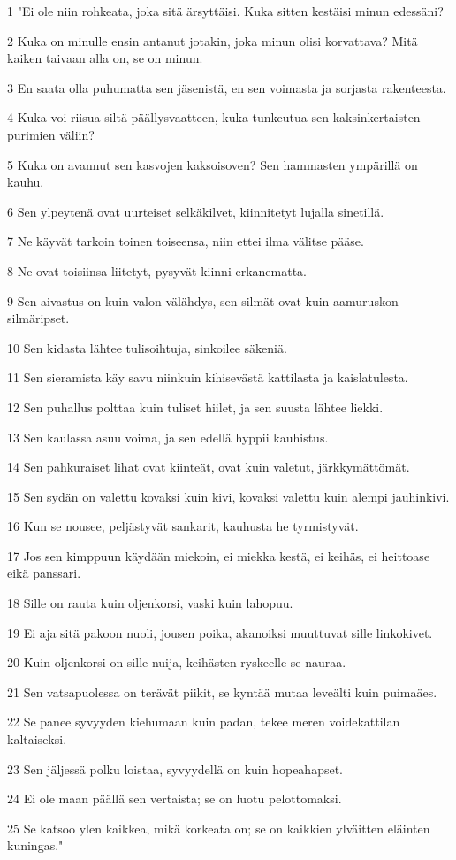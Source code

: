 \par 1 "Ei ole niin rohkeata, joka sitä ärsyttäisi. Kuka sitten kestäisi minun edessäni?
\par 2 Kuka on minulle ensin antanut jotakin, joka minun olisi korvattava? Mitä kaiken taivaan alla on, se on minun.
\par 3 En saata olla puhumatta sen jäsenistä, en sen voimasta ja sorjasta rakenteesta.
\par 4 Kuka voi riisua siltä päällysvaatteen, kuka tunkeutua sen kaksinkertaisten purimien väliin?
\par 5 Kuka on avannut sen kasvojen kaksoisoven? Sen hammasten ympärillä on kauhu.
\par 6 Sen ylpeytenä ovat uurteiset selkäkilvet, kiinnitetyt lujalla sinetillä.
\par 7 Ne käyvät tarkoin toinen toiseensa, niin ettei ilma välitse pääse.
\par 8 Ne ovat toisiinsa liitetyt, pysyvät kiinni erkanematta.
\par 9 Sen aivastus on kuin valon välähdys, sen silmät ovat kuin aamuruskon silmäripset.
\par 10 Sen kidasta lähtee tulisoihtuja, sinkoilee säkeniä.
\par 11 Sen sieramista käy savu niinkuin kihisevästä kattilasta ja kaislatulesta.
\par 12 Sen puhallus polttaa kuin tuliset hiilet, ja sen suusta lähtee liekki.
\par 13 Sen kaulassa asuu voima, ja sen edellä hyppii kauhistus.
\par 14 Sen pahkuraiset lihat ovat kiinteät, ovat kuin valetut, järkkymättömät.
\par 15 Sen sydän on valettu kovaksi kuin kivi, kovaksi valettu kuin alempi jauhinkivi.
\par 16 Kun se nousee, peljästyvät sankarit, kauhusta he tyrmistyvät.
\par 17 Jos sen kimppuun käydään miekoin, ei miekka kestä, ei keihäs, ei heittoase eikä panssari.
\par 18 Sille on rauta kuin oljenkorsi, vaski kuin lahopuu.
\par 19 Ei aja sitä pakoon nuoli, jousen poika, akanoiksi muuttuvat sille linkokivet.
\par 20 Kuin oljenkorsi on sille nuija, keihästen ryskeelle se nauraa.
\par 21 Sen vatsapuolessa on terävät piikit, se kyntää mutaa leveälti kuin puimaäes.
\par 22 Se panee syvyyden kiehumaan kuin padan, tekee meren voidekattilan kaltaiseksi.
\par 23 Sen jäljessä polku loistaa, syvyydellä on kuin hopeahapset.
\par 24 Ei ole maan päällä sen vertaista; se on luotu pelottomaksi.
\par 25 Se katsoo ylen kaikkea, mikä korkeata on; se on kaikkien ylväitten eläinten kuningas."

